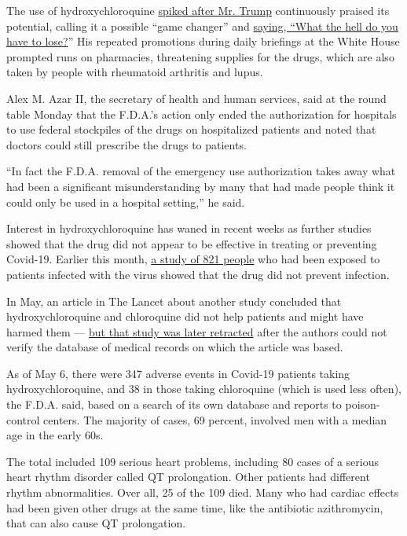 The use of hydroxychloroquine
\href{https://www.nytimes3xbfgragh.onion/2020/04/25/us/coronavirus-trump-chloroquine-hydroxychloroquine.html}{spiked
after Mr. Trump} continuously praised its potential, calling it a
possible ``game changer'' and
\href{https://www.nytimes3xbfgragh.onion/2020/03/20/health/coronavirus-chloroquine-trump.html}{saying,
``What the hell do you have to lose?}'' His repeated promotions during
daily briefings at the White House prompted runs on pharmacies,
threatening supplies for the drugs, which are also taken by people with
rheumatoid arthritis and lupus.

Alex M. Azar II, the secretary of health and human services, said at the
round table Monday that the F.D.A.'s action only ended the authorization
for hospitals to use federal stockpiles of the drugs on hospitalized
patients and noted that doctors could still prescribe the drugs to
patients.

``In fact the F.D.A. removal of the emergency use authorization takes
away what had been a significant misunderstanding by many that had made
people think it could only be used in a hospital setting,'' he said.

Interest in hydroxychloroquine has waned in recent weeks as further
studies showed that the drug did not appear to be effective in treating
or preventing Covid-19. Earlier this month,
\href{https://www.nytimes3xbfgragh.onion/2020/06/03/health/hydroxychloroquine-coronavirus-trump.html}{a
study of 821 people} who had been exposed to patients infected with the
virus showed that the drug did not prevent infection.

In May, an article in The Lancet about another study concluded that
hydroxychloroquine and chloroquine did not help patients and might have
harmed them ---
\href{https://www.nytimes3xbfgragh.onion/2020/06/04/health/coronavirus-hydroxychloroquine.html}{but
that study was later retracted} after the authors could not verify the
database of medical records on which the article was based.

As of May 6, there were 347 adverse events in Covid-19 patients taking
hydroxychloroquine, and 38 in those taking chloroquine (which is used
less often), the F.D.A. said, based on a search of its own database and
reports to poison-control centers. The majority of cases, 69 percent,
involved men with a median age in the early 60s.

The total included 109 serious heart problems, including 80 cases of a
serious heart rhythm disorder called QT prolongation. Other patients had
different rhythm abnormalities. Over all, 25 of the 109 died. Many who
had cardiac effects had been given other drugs at the same time, like
the antibiotic azithromycin, that can also cause QT prolongation.


